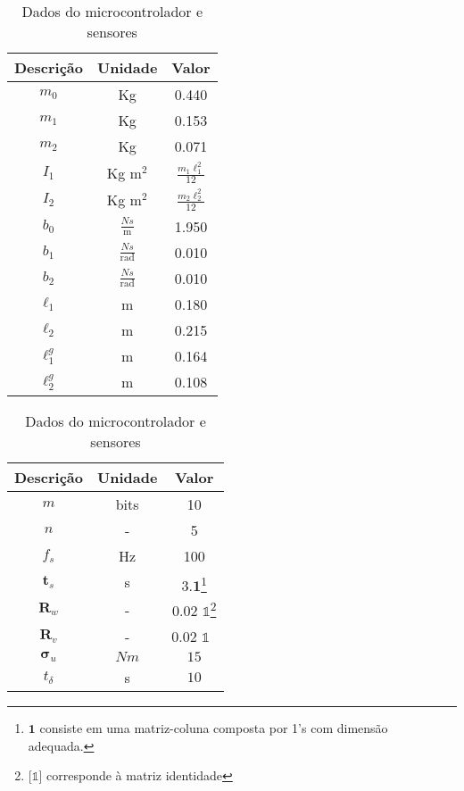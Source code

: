 \documentclass[a4paper, twoside]{article}
\begin{document}
    \begin{table}[!ht]
        \begin{minipage}[b]{0.45\linewidth}\centering
                \begin{tabular}{|c|c|c|}
                    \hline Descrição & Unidade & Valor\\ \hline
                    $m_0$ & Kg & 0.440\\
                    $m_1$ & Kg & 0.153\\
                    $m_2$ & Kg & 0.071\\
                    $I_1$ & Kg m$^2$ & $\frac{m_1 \ell_1^2}{12}$\\
                    $I_2$ & Kg m$^2$ & $\frac{m_2 \ell_2^2}{12}$\\ 
                    $b_0$   & $\frac{N s}{\mathrm{m}}$ & 1.950\\
                    $b_1$   & $\frac{N s}{\mathrm{rad}}$ & 0.010\\
                    $b_2$   & $\frac{N s}{\mathrm{rad}}$ & 0.010\\
                    $\ell_1$ & m & 0.180\\ 
                    $\ell_2$ & m  & 0.215\\
                    $\ell_1^g$ & m & 0.164\\ 
                    $\ell_2^g$ & m  & 0.108\\ \hline
                \end{tabular}
                \caption{Dados da planta}
                \label{tab:dados_planta}
        \end{minipage}
        \hspace{0.5cm}
        \begin{minipage}[b]{0.45\linewidth}
        \centering
                \begin{tabular}{|c|c|c|}
                    \hline Descrição & Unidade & Valor\\ \hline
                    $m$ & bits & 10 \\
                    $n$ & - & 5 \\
                    $f_s$ & Hz & 100 \\
                    $\mathbf{t}_s$ & s & $3.\mathbf{1}$\footnote{$\mathbf{1} $ consiste em uma matriz-coluna composta por 1's com dimensão adequada.} \\
                    $\mathbf{R}_w$ & - & 0.02 $\mathds{1}$\footnote{[$\mathds{1}$] corresponde à matriz identidade}  \\ 
                    $\mathbf{R}_v$ & - & 0.02 $\mathds{1}$ \, \\
                    $\mathbf{\sigma}_u$ & $N m$ & $15$ \\
                    $t_{\delta}$ & s & $10$ \\
                    \hline
                \end{tabular}
                \caption{Dados do microcontrolador e sensores}
                \label{tab:dados_controle}
        \end{minipage}
    \end{table}

    \clearpage
    \printbibliography
\end{document}
